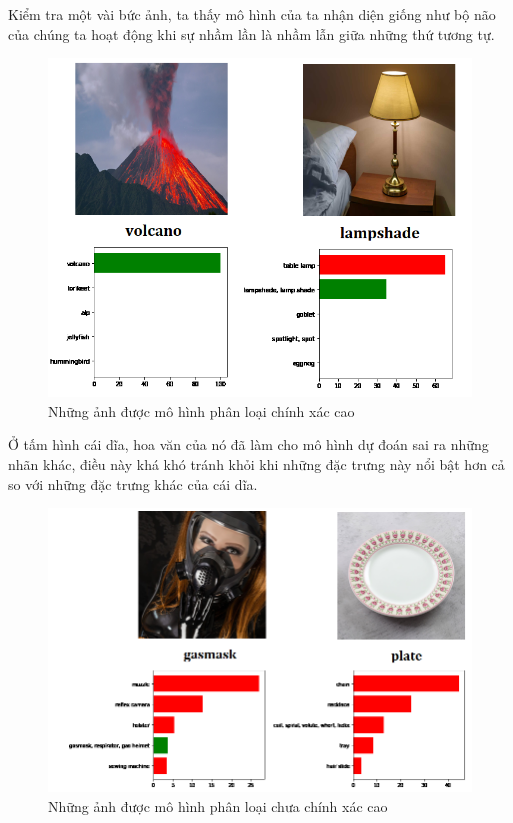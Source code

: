 \documentclass[a4paper]{article}
\begin{document}
\noindent
Kiểm tra một vài bức ảnh, ta thấy mô hình của ta nhận diện giống như bộ não của chúng ta hoạt động khi sự nhầm lần là nhầm lẫn giữa những thứ tương tự.
\begin{figure}[h!]
\centering
\includegraphics[width=13.3cm]{images/res1.PNG}
\caption{Những ảnh được mô hình phân loại chính xác cao}
\end{figure}

\noindent
Ở tấm hình cái dĩa, hoa văn của nó đã làm cho mô hình dự đoán sai ra những nhãn khác, điều này khá khó tránh khỏi khi những đặc trưng này nổi bật hơn cả so với những đặc trưng khác của cái dĩa.

\begin{figure}[h!]
\centering
\includegraphics[width=13.3cm]{images/res2.PNG}
\caption{Những ảnh được mô hình phân loại chưa chính xác cao}
\end{figure}
\end{document}
